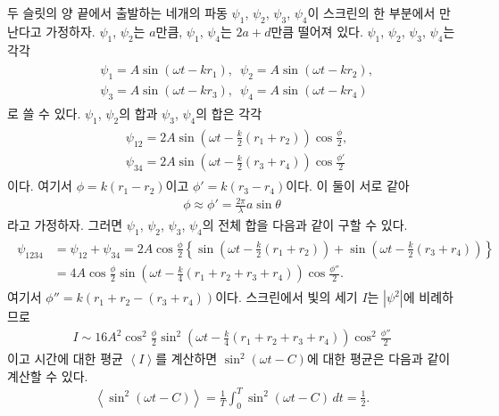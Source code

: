 \documentclass[tightenlines,floatfix,nofootinbib,superscriptaddress,fleqn]{revtex4}
\begin{document}
 두 슬릿의 양 끝에서 출발하는 네개의 파동 
$\psi_1$, $\psi_2$, $\psi_3$, $\psi_4$이 스크린의 한 부분에서 만난다고 가정하자.
$\psi_1$, $\psi_2$는 $a$만큼, $\psi_1$, $\psi_4$는 $2a+d$만큼 떨어져 있다.
$\psi_1$, $\psi_2$, $\psi_3$, $\psi_4$는 각각
\begin{align}
  \begin{split}
    &\psi_1=A\sin(\omega t-kr_1),\,\,\,\psi_2=A\sin(\omega t-kr_2), \\
    &\psi_3=A\sin(\omega t-kr_3),\,\,\,\psi_4=A\sin(\omega t-kr_4)
  \end{split}
\end{align}
로 쓸 수 있다. $\psi_1$, $\psi_2$의 합과 $\psi_3$, $\psi_4$의 합은 각각
\begin{align}
  \begin{split}
    &\psi_{12}=2A\sin\left(\omega t-\frac{k}{2}(r_1+r_2)\right)\cos\frac{\phi}{2}, \\
    &\psi_{34}=2A\sin\left(\omega t-\frac{k}{2}(r_3+r_4)\right)\cos\frac{\phi'}{2}
  \end{split}
\end{align}
이다. 여기서 $\phi = k(r_1-r_2)$이고 $\phi' = k(r_3-r_4)$이다. 이 둘이 서로 같아
\begin{align}
  \phi \approx \phi' = \frac{2\pi}{\lambda}a\sin\theta
\end{align}
라고 가정하자. 그러면 $\psi_1$, $\psi_2$, $\psi_3$, $\psi_4$의 전체 합을 다음과 같이
구할 수 있다.
\begin{align}
  \begin{split}
    \psi_{1234} &= \psi_{12}+\psi_{34}
    =2A\cos\frac{\phi}{2}\left\{\sin\left(\omega t-\frac{k}{2}(r_1+r_2)\right)
    +\sin\left(\omega t-\frac{k}{2}(r_3+r_4)\right)\right\} \\
    &=4A\cos\frac{\phi}{2}\sin\left(\omega t-\frac{k}{4}(r_1+r_2+r_3+r_4)\right)
    \cos\frac{\phi''}{2}.
  \end{split}
\end{align}
여기서 $\phi''=k(r_1+r_2-(r_3+r_4))$이다. 스크린에서 빛의 세기 $I$는 $|\psi^2|$에
비례하므로
\begin{align}
  I \sim  16A^2\cos^2\frac{\phi}{2}\sin^2\left(\omega t-\frac{k}{4}(r_1+r_2+r_3+r_4)\right)
  \cos^2\frac{\phi''}{2}
\end{align}
이고 시간에 대한 평균 $\left<I\right>$를 계산하면 $\sin^2(\omega t - C)$에 대한 평균은
다음과 같이 계산할 수 있다.
\begin{align}
  \left<\sin^2(\omega t - C)\right>
  =\frac{1}{T}\int_0^T\sin^2(\omega t - C)\,dt = \frac{1}{2}.
\end{align}
\end{document}
